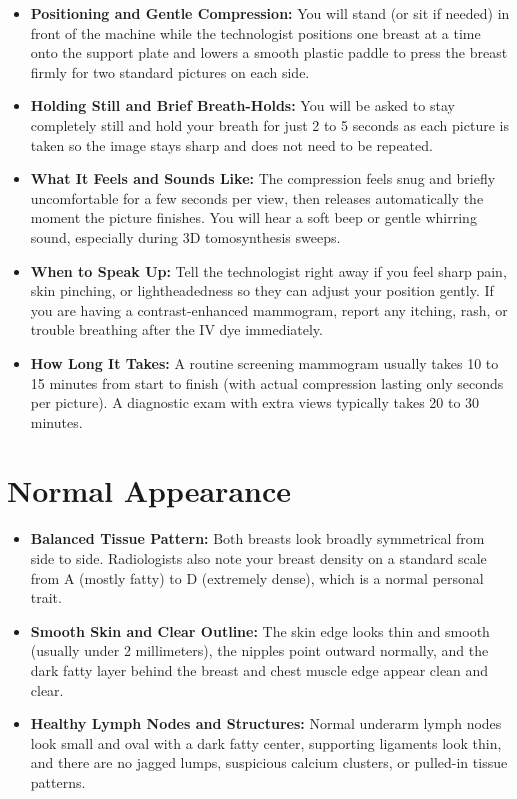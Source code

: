 \begin{itemize}
    \item \textbf{Positioning and Gentle Compression:} You will stand (or sit if needed) in front of the machine while the technologist positions one breast at a time onto the support plate and lowers a smooth plastic paddle to press the breast firmly for two standard pictures on each side.
    \item \textbf{Holding Still and Brief Breath-Holds:} You will be asked to stay completely still and hold your breath for just 2 to 5 seconds as each picture is taken so the image stays sharp and does not need to be repeated.
    \item \textbf{What It Feels and Sounds Like:} The compression feels snug and briefly uncomfortable for a few seconds per view, then releases automatically the moment the picture finishes. You will hear a soft beep or gentle whirring sound, especially during 3D tomosynthesis sweeps.
    \item \textbf{When to Speak Up:} Tell the technologist right away if you feel sharp pain, skin pinching, or lightheadedness so they can adjust your position gently. If you are having a contrast-enhanced mammogram, report any itching, rash, or trouble breathing after the IV dye immediately.
    \item \textbf{How Long It Takes:} A routine screening mammogram usually takes 10 to 15 minutes from start to finish (with actual compression lasting only seconds per picture). A diagnostic exam with extra views typically takes 20 to 30 minutes.
\end{itemize}

\section{Normal Appearance}

\begin{itemize}
    \item \textbf{Balanced Tissue Pattern:} Both breasts look broadly symmetrical from side to side. Radiologists also note your breast density on a standard scale from A (mostly fatty) to D (extremely dense), which is a normal personal trait.
    \item \textbf{Smooth Skin and Clear Outline:} The skin edge looks thin and smooth (usually under 2 millimeters), the nipples point outward normally, and the dark fatty layer behind the breast and chest muscle edge appear clean and clear.
    \item \textbf{Healthy Lymph Nodes and Structures:} Normal underarm lymph nodes look small and oval with a dark fatty center, supporting ligaments look thin, and there are no jagged lumps, suspicious calcium clusters, or pulled-in tissue patterns.
\end{itemize}

